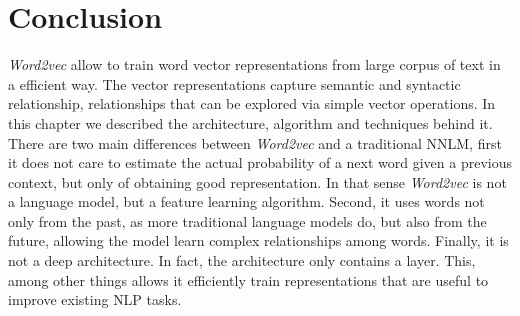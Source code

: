 \section{Conclusion}
\label{sec:sub-w2v-desc-conclusion}
\textit{Word2vec} allow to train word vector representations from  large
corpus of text in a efficient way. The vector  representations  capture semantic and
syntactic relationship, relationships that can be explored via simple vector
operations. In this chapter we described the  architecture, algorithm and techniques
behind it.  There are two main differences between \textit{Word2vec} and a traditional \ac{NNLM}, first
it does not care to estimate the actual probability of  a next word given a
previous context, but only of obtaining good representation. In that sense
\textit{Word2vec} is not a  language model, but a feature learning algorithm.  Second, it uses
words not only from the past, as more traditional language models do, but
also from the future, allowing the model learn complex relationships among
words.  Finally, it is not a deep architecture. In fact, the architecture only
contains a layer. This, among other things allows it efficiently train
representations that are useful to improve existing \ac{NLP} tasks.








